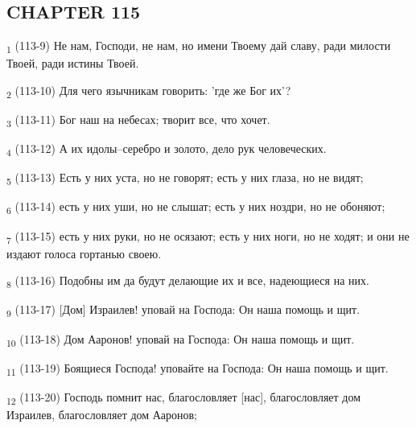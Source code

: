 \subsection{CHAPTER 115}
\begin{tcolorbox}
\textsubscript{1} (113-9) Не нам, Господи, не нам, но имени Твоему дай славу, ради милости Твоей, ради истины Твоей.
\end{tcolorbox}
\begin{tcolorbox}
\textsubscript{2} (113-10) Для чего язычникам говорить: 'где же Бог их'?
\end{tcolorbox}
\begin{tcolorbox}
\textsubscript{3} (113-11) Бог наш на небесах; творит все, что хочет.
\end{tcolorbox}
\begin{tcolorbox}
\textsubscript{4} (113-12) А их идолы--серебро и золото, дело рук человеческих.
\end{tcolorbox}
\begin{tcolorbox}
\textsubscript{5} (113-13) Есть у них уста, но не говорят; есть у них глаза, но не видят;
\end{tcolorbox}
\begin{tcolorbox}
\textsubscript{6} (113-14) есть у них уши, но не слышат; есть у них ноздри, но не обоняют;
\end{tcolorbox}
\begin{tcolorbox}
\textsubscript{7} (113-15) есть у них руки, но не осязают; есть у них ноги, но не ходят; и они не издают голоса гортанью своею.
\end{tcolorbox}
\begin{tcolorbox}
\textsubscript{8} (113-16) Подобны им да будут делающие их и все, надеющиеся на них.
\end{tcolorbox}
\begin{tcolorbox}
\textsubscript{9} (113-17) [Дом] Израилев! уповай на Господа: Он наша помощь и щит.
\end{tcolorbox}
\begin{tcolorbox}
\textsubscript{10} (113-18) Дом Ааронов! уповай на Господа: Он наша помощь и щит.
\end{tcolorbox}
\begin{tcolorbox}
\textsubscript{11} (113-19) Боящиеся Господа! уповайте на Господа: Он наша помощь и щит.
\end{tcolorbox}
\begin{tcolorbox}
\textsubscript{12} (113-20) Господь помнит нас, благословляет [нас], благословляет дом Израилев, благословляет дом Ааронов;
\end{tcolorbox}

